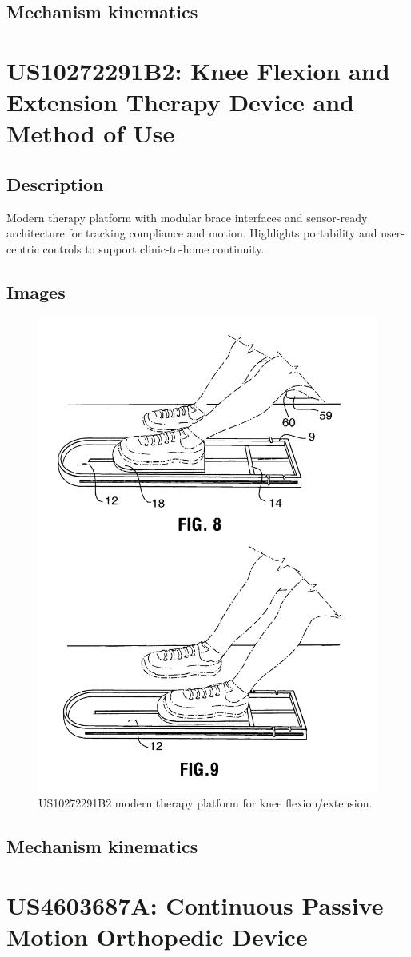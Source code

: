 \documentclass[11pt]{article}
\begin{document}
\subsection{Mechanism kinematics}

\section{US10272291B2: Knee Flexion and Extension Therapy Device and Method of Use}
\subsection{Description}
Modern therapy platform with modular brace interfaces and sensor-ready architecture for tracking compliance and motion. Highlights portability and user-centric controls to support clinic-to-home continuity.
\subsection{Images}
\begin{figure}[H]
  \centering
  \includegraphics[width=0.54\linewidth]{10272291B2_1.png}
  \caption{US10272291B2 modern therapy platform for knee flexion/extension.}
  \label{fig:US10272291B2}
\end{figure}

\subsection{Mechanism kinematics}

\section{US4603687A: Continuous Passive Motion Orthopedic Device}
\end{document}
